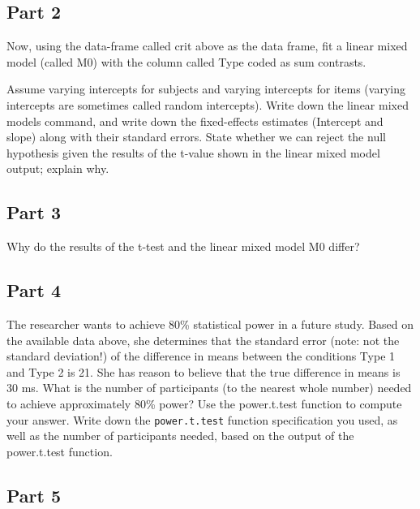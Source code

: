 \documentclass[12pt,]{krantz}
\begin{document}
\hypertarget{sec:LMExercisesPart2}{%
\subsection{Part 2}\label{sec:LMExercisesPart2}}

Now, using the data-frame called crit above as the data frame, fit a linear mixed model (called M0) with the column called Type coded as sum contrasts.

Assume varying intercepts for subjects and varying intercepts for items (varying intercepts are sometimes called random intercepts). Write down the linear mixed models command, and write down the fixed-effects estimates (Intercept and slope) along with their standard errors. State whether we can reject the null hypothesis given the results of the t-value shown in the linear mixed model output; explain why.

\hypertarget{sec:LMExercisesPart3}{%
\subsection{Part 3}\label{sec:LMExercisesPart3}}

Why do the results of the t-test and the linear mixed model M0 differ?

\hypertarget{sec:LMExercisesPart4}{%
\subsection{Part 4}\label{sec:LMExercisesPart4}}

The researcher wants to achieve 80\% statistical power in a future study. Based on the available data above, she determines that the standard error (note: not the standard deviation!) of the difference in means between the conditions Type 1 and Type 2 is 21. She has reason to believe that the true difference in means is 30 ms. What is the number of participants (to the nearest whole number) needed to achieve approximately 80\% power? Use the power.t.test function to compute your answer. Write down the \texttt{power.t.test} function specification you used, as well as the number of participants needed, based on the output of the power.t.test function.

\hypertarget{sec:LMExercisesPart5}{%
\subsection{Part 5}\label{sec:LMExercisesPart5}}
\end{document}
